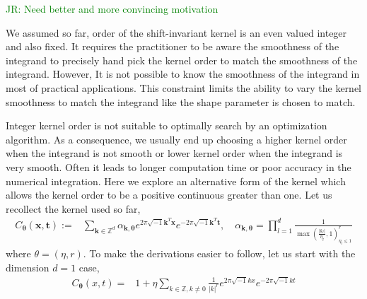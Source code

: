 \documentclass{iitthesis}          %
\newcommand{\bm}[1]{\boldsymbol{#1}}
\newcommand{\vtheta}{{\bm{\theta}}}
\newcommand{\vk}{\bm{k}}
\newcommand{\vt}{\bm{t}}
\newcommand{\vx}{\bm{x}}
\def\abs#1{\ensuremath{\left \lvert #1 \right \rvert}}
\newcommand{\JRNote}[1]{{\textcolor{green}{JR: #1}}}
\begin{document}
\JRNote{Need better and more convincing motivation}

We assumed so far, order of the shift-invariant kernel is an even valued integer and also fixed. 
It requires the practitioner to be aware the smoothness of the integrand to precisely hand pick the kernel order to match the smoothness of the integrand.
However, It is not possible to know the smoothness of the integrand in most of practical applications. 
This constraint limits the ability to vary the kernel smoothness to match the integrand like the shape parameter is chosen to match. 

Integer kernel order is not suitable to optimally search by an optimization algorithm.
As a consequence, we usually end up choosing a higher kernel order when the integrand is not  smooth or lower kernel order when the integrand is very smooth.
Often it leads to longer computation time or poor accuracy in the numerical integration.
Here we explore an alternative form of the kernel which allows the kernel order to be a positive continuous greater than one. Let us recollect the kernel used so far,
\begin{align*}
C_\vtheta(\vx, \vt) := &  \sum_{\vk \in \mathbb{Z}^d} \alpha_{\vk,\vtheta}  e^{2 \pi\sqrt{-1} \vk^T\vx}
e^{-2 \pi\sqrt{-1} \vk^T\vt}, \quad \alpha_{\vk,\vtheta} = \prod_{l=1}^d \frac{1}{\max(\frac{|k_l|}{\eta_l},1)^r_{\eta_l\leq 1}} 
\end{align*}
where $\theta = (\eta, r)$.  
To make the derivations easier to follow, let us start with the dimension $d=1$ case,
\begin{align*}
C_\vtheta(x, t) = & 1 + \eta \sum_{k \in \mathbb{Z}, k \neq 0 } \frac{1}{\abs{k}^r} 
e^{ 2 \pi\sqrt{-1} k x}
e^{-2 \pi\sqrt{-1} k t}
\end{align*}
\end{document}

